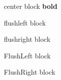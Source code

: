 
\centering
\raggedright
\raggedleft
\flushright
\flushleft

\usepackage{ragged2e}
\begin{center} center block \textbf{bold} \end{center}
\begin{flushleft} flushleft block \end{flushleft}
\begin{flushright} flushright block \end{flushright}
\begin{FlushLeft} FlushLeft block \end{FlushLeft}
\begin{FlushRight} FlushRight block \end{FlushRight}
